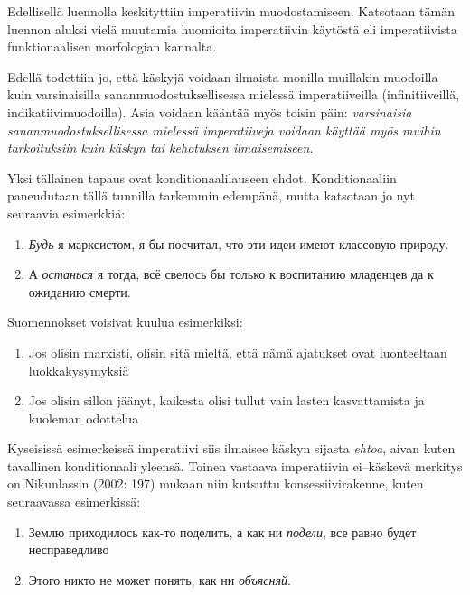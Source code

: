 \documentclass[]{scrartcl}
\providecommand{\tightlist}{%
  \setlength{\itemsep}{0pt}\setlength{\parskip}{0pt}}
\begin{document}
Edellisellä luennolla keskityttiin imperatiivin muodostamiseen.
Katsotaan tämän luennon aluksi vielä muutamia huomioita imperatiivin
käytöstä eli imperatiivista funktionaalisen morfologian kannalta.

Edellä todettiin jo, että käskyjä voidaan ilmaista monilla muillakin
muodoilla kuin varsinaisilla sananmuodostuksellisessa mielessä
imperatiiveilla (infinitiiveillä, indikatiivimuodoilla). Asia voidaan
kääntää myös toisin päin: \emph{varsinaisia sananmuodostuksellisessa
mielessä imperatiiveja voidaan käyttää myös muihin tarkoituksiin kuin
käskyn tai kehotuksen ilmaisemiseen}.

Yksi tällainen tapaus ovat konditionaalilauseen ehdot. Konditionaaliin
paneudutaan tällä tunnilla tarkemmin edempänä, mutta katsotaan jo nyt
seuraavia esimerkkiä:

\begin{enumerate}
\def\labelenumi{(\arabic{enumi})}
\setcounter{enumi}{362}
\tightlist
\item
  \emph{Будь} я марксистом, я бы посчитал, что эти идеи имеют классовую
  природу.
\item
  А \emph{останься} я тогда, всё свелось бы только к воспитанию
  младенцев да к ожиданию смерти.
\end{enumerate}

Suomennokset voisivat kuulua esimerkiksi:

\begin{enumerate}
\def\labelenumi{(\arabic{enumi})}
\setcounter{enumi}{364}
\tightlist
\item
  Jos olisin marxisti, olisin sitä mieltä, että nämä ajatukset ovat
  luonteeltaan luokkakysymyksiä
\item
  Jos olisin sillon jäänyt, kaikesta olisi tullut vain lasten
  kasvattamista ja kuoleman odottelua
\end{enumerate}

Kyseisissä esimerkeissä imperatiivi siis ilmaisee käskyn sijasta
\emph{ehtoa}, aivan kuten tavallinen konditionaali yleensä. Toinen
vastaava imperatiivin ei--käskevä merkitys on Nikunlassin (2002: 197)
mukaan niin kutsuttu konsessiivirakenne, kuten seuraavassa esimerkissä:

\begin{enumerate}
\def\labelenumi{(\arabic{enumi})}
\setcounter{enumi}{366}
\tightlist
\item
  Землю приходилось как-то поделить, а как ни \emph{подели}, все равно
  будет несправедливо
\item
  Этого никто не может понять, как ни \emph{объясняй}.
\end{enumerate}
\end{document}
